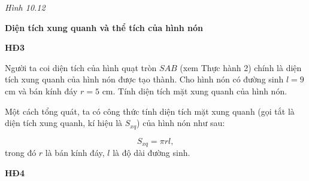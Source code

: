     \begin{center}

        \textit{Hình 10.12}
    \end{center}

    \answerline
    \answerline

    \textbf{Diện tích xung quanh và thể tích của hình nón}

    \textbf{HĐ3}

    Người ta coi diện tích của hình quạt tròn $SAB$ (xem Thực hành 2) chính là diện tích xung quanh của hình nón được tạo thành. Cho hình nón có đường sinh $l=9$ cm và bán kính đáy $r=5$ cm. Tính diện tích mặt xung quanh của hình nón.

    \answerline
    \answerline

    Một cách tổng quát, ta có công thức tính diện tích mặt xung quanh (gọi tắt là diện tích xung quanh, kí hiệu là $S_{xq}$) của hình nón như sau:

    \begin{keyconcept}
        \[
            S_{xq}=\pi rl,
        \]
        trong đó $r$ là bán kính đáy, $l$ là độ dài đường sinh.
    \end{keyconcept}

    \textbf{HĐ4}

